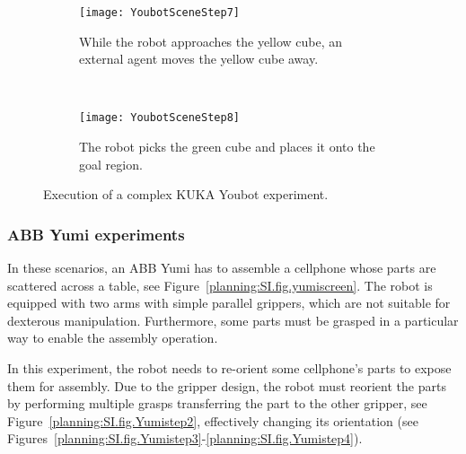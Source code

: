 {\begin{figure}[h]
        \centering
              \begin{subfigure}[b]{1\columnwidth}
                \centering
                \texttt{[image: YoubotSceneStep7]}
                \caption{While the robot approaches the yellow cube, an external agent moves the yellow cube away.}
                 \label{planning:DSI.fig.youbotstep7}  
        \end{subfigure}      
        ~   
              \begin{subfigure}[b]{1\columnwidth}
                \centering
                \texttt{[image: YoubotSceneStep8]}
                \caption{The robot picks the green cube and places it onto the goal region. }
                 \label{planning:DSI.fig.youbotstep8}  
        \end{subfigure}        
        \caption{Execution of a complex KUKA Youbot experiment.}
        \label{planning:DSI.fig.youscreen2bis}
\end{figure}
\clearpage


\subsubsection{ABB Yumi experiments}


In these scenarios, an ABB Yumi has to assemble a cellphone whose parts are scattered across a table, see Figure~\ref{planning:SI.fig.yumiscreen}. 
The robot is equipped with two arms with simple parallel grippers, which are not suitable for dexterous manipulation.
Furthermore, some parts must be grasped in a particular way to enable the assembly operation. 
\begin{experiment}
In this experiment, the robot needs to re-orient some cellphone's parts to expose them for assembly. Due to the gripper design, the robot must reorient the parts by performing multiple grasps transferring the part to the other gripper, see Figure~\ref{planning:SI.fig.Yumistep2}, effectively changing its orientation (see Figures~\ref{planning:SI.fig.Yumistep3}-\ref{planning:SI.fig.Yumistep4}).
\end{experiment}
}



